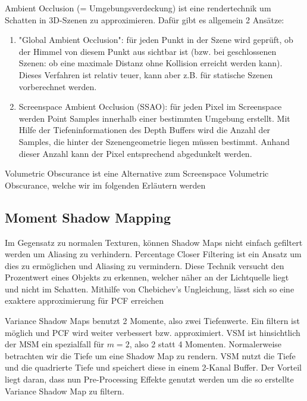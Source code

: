 \documentclass[runningheaders,a4paper]{llncs}
\begin{document}
Ambient Occlusion (= Umgebungsverdeckung) ist eine rendertechnik um Schatten in 3D-Szenen
zu approximieren. Dafür gibt es allgemein 2 Ansätze:
\begin{enumerate}
	\item "Global Ambient Occlusion": für jeden Punkt in der Szene wird geprüft, ob der Himmel von diesem
		Punkt aus sichtbar ist (bzw. bei geschlossenen Szenen: ob eine maximale Distanz ohne Kollision erreicht
		 werden kann). Dieses Verfahren ist relativ teuer, kann aber z.B. für statische Szenen vorberechnet
		 werden.
		\cite{aoPaper}
	\item Screenspace Ambient Occlusion (SSAO): für jeden Pixel im Screenspace werden Point Samples
		innerhalb einer bestimmten Umgebung erstellt. Mit Hilfe der Tiefeninformationen des Depth Buffers
		wird die Anzahl der Samples, die hinter der Szenengeometrie liegen müssen bestimmt. Anhand dieser Anzahl
		kann der Pixel entsprechend abgedunkelt werden.  \cite{cry2Paper}
\end{enumerate}  
Volumetric Obscurance ist eine Alternative zum Screenspace Volumetric Obscurance, welche wir im folgenden
Erläutern werden

\cite{loos2010volumetric}

\subsection{Moment Shadow Mapping}

Im Gegensatz zu normalen Texturen, können Shadow Maps nicht einfach gefiltert werden um Aliasing zu verhindern. 
Percentage Closer Filtering ist ein Ansatz um dies zu ermöglichen und Aliasing zu vermindern. Diese Technik versucht den Prozentwert eines Objekts zu erkennen, welcher näher an der Lichtquelle liegt und nicht im Schatten. 
Mithilfe von Chebichev's Ungleichung, lässt sich so eine exaktere approximierung für PCF erreichen \cite{reeves1987rendering}

Variance Shadow Maps benutzt 2 Momente, also zwei Tiefenwerte. Ein filtern ist  möglich und PCF wird weiter verbessert bzw. approximiert. VSM ist hinsichtlich der MSM ein spezialfall für $m = 2$, also 2 statt 4 Momenten. Normalerweise betrachten wir die Tiefe um eine Shadow Map zu rendern. VSM nutzt die Tiefe und die quadrierte Tiefe und speichert diese in einem 2-Kanal Buffer. Der Vorteil liegt daran, dass nun Pre-Processing Effekte genutzt werden um die so erstellte Variance Shadow Map zu filtern.\cite{donnelly2006variance}
\end{document}
